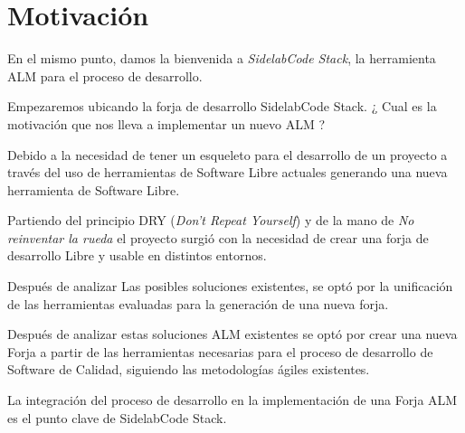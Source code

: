 \documentclass[a4paper, 12pt]{book}
\begin{document}
\newpage


\tableofcontents  %

\newpage









\chapter{Motivaci\'on}
\label{chap:motivacion}

\par En el mismo punto, damos la bienvenida a \emph{SidelabCode Stack}, la herramienta ALM para el proceso de desarrollo.

\par Empezaremos ubicando la forja de desarrollo SidelabCode Stack. ¿ Cual es la motivaci\'on que nos lleva a implementar un nuevo ALM ?

\par Debido a la necesidad de tener un esqueleto para el desarrollo de un proyecto a trav\'es del uso de herramientas de Software Libre actuales generando una nueva herramienta de Software Libre.

\par Partiendo del principio DRY (\emph{Don't Repeat Yourself}) y de la mano de \emph{No reinventar la rueda} el proyecto surgi\'o con la necesidad de crear una forja de desarrollo Libre y usable en distintos entornos.

\par Despu\'es de analizar Las posibles soluciones existentes, se opt\'o por la unificaci\'on de las herramientas evaluadas para la generaci\'on de una nueva forja. 

\par Despu\'es de analizar estas soluciones ALM existentes se opt\'o por crear una nueva Forja a partir de las herramientas necesarias para el proceso de desarrollo de Software de Calidad, siguiendo las metodolog\'ias \'agiles existentes.

\par La integraci\'on del proceso de desarrollo en la implementaci\'on de una Forja ALM es el punto clave de SidelabCode Stack.
\end{document}
